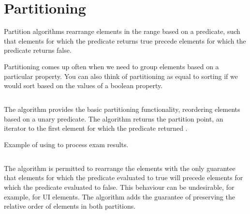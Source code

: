 \section{Partitioning}

Partition algorithms rearrange elements in the range based on a predicate, such that elements for which the predicate returns true precede elements for which the predicate returns false.

Partitioning comes up often when we need to group elements based on a particular property. You can also think of partitioning as equal to sorting if we would sort based on the values of a boolean property.

\subsection{\texorpdfstring{}{\texttt{std::partition}}}

The  algorithm provides the basic partitioning functionality, reordering elements based on a unary predicate. The algorithm returns the partition point, an iterator to the first element for which the predicate returned .


\begin{box-note}
\footnotesize Example of using  to process exam results.
\tcblower
{}
\end{box-note}

\subsection{\texorpdfstring{}{\texttt{std::stable\_partition}}}

The  algorithm is permitted to rearrange the elements with the only guarantee that elements for which the predicate evaluated to true will precede elements for which the predicate evaluated to false. This behaviour can be undesirable, for example, for UI elements. The  algorithm adds the guarantee of preserving the relative order of elements in both partitions.


